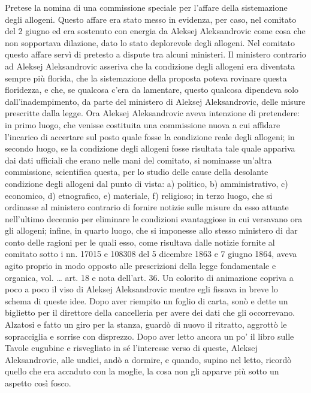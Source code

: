 Pretese la nomina di una commissione speciale per l'affare della sistemazione degli allogeni. Questo affare era stato messo in evidenza, per caso, nel comitato del 2 giugno ed era sostenuto con energia da Aleksej Aleksandrovic come cosa che non sopportava dilazione, dato lo stato deplorevole degli allogeni. Nel comitato questo affare servì di pretesto a dispute tra alcuni ministeri. Il ministero contrario ad Aleksej Aleksandrovic asseriva che la condizione degli allogeni era diventata sempre più florida, che la sistemazione della proposta poteva rovinare questa floridezza, e che, se qualcosa c'era da lamentare, questo qualcosa dipendeva solo dall'inadempimento, da parte del ministero di Aleksej Aleksandrovic, delle misure prescritte dalla legge. Ora Aleksej Aleksandrovic aveva intenzione di pretendere: in primo luogo, che venisse costituita una commissione nuova a cui affidare l'incarico di accertare sul posto quale fosse la condizione reale degli allogeni; in secondo luogo, se la condizione degli allogeni fosse risultata tale quale appariva dai dati ufficiali che erano nelle mani del comitato, si nominasse un'altra commissione, scientifica questa, per lo studio delle cause della desolante condizione degli allogeni dal punto di vista: a) politico, b) amministrativo, c) economico, d) etnografico, e) materiale, f) religioso; in terzo luogo, che si ordinasse al ministero contrario di fornire notizie sulle misure da esso attuate nell'ultimo decennio per eliminare le condizioni svantaggiose in cui versavano ora gli allogeni; infine, in quarto luogo, che si imponesse allo stesso ministero di dar conto delle ragioni per le quali esso, come risultava dalle notizie fornite al comitato sotto i nn. 17015 e 108308 del 5 dicembre 1863 e 7 giugno 1864, aveva agito proprio in modo opposto alle prescrizioni della legge fondamentale e organica, vol. \ldots{} art. 18 e nota dell'art. 36. Un colorito di animazione copriva a poco a poco il viso di Aleksej Aleksandrovic mentre egli fissava in breve lo schema di queste idee. Dopo aver riempito un foglio di carta, sonò e dette un biglietto per il direttore della cancelleria per avere dei dati che gli occorrevano. Alzatosi e fatto un giro per la stanza, guardò di nuovo il ritratto, aggrottò le sopracciglia e sorrise con disprezzo. Dopo aver letto ancora un po' il libro sulle Tavole eugubine e risvegliato in sé l'interesse verso di queste, Aleksej Aleksandrovic, alle undici, andò a dormire, e quando, supino nel letto, ricordò quello che era accaduto con la moglie, la cosa non gli apparve più sotto un aspetto così fosco. 

